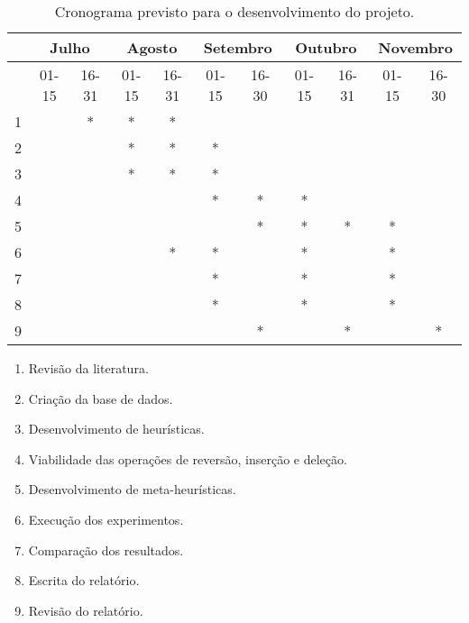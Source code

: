 \documentclass[a4paper, 11pt]{article}
\begin{document}
        \begin{table}[H]
            \centering
            \begin{tabular}{|c||c|c|c|c|c|c|c|c|c|c|}
                \hline
                 & \multicolumn{2}{c|}{Julho} & \multicolumn{2}{c|}{Agosto} & \multicolumn{2}{c|}{Setembro} & \multicolumn{2}{c|}{Outubro} & \multicolumn{2}{c|}{Novembro} \\
                \hline
                 & 01-15 & 16-31 & 01-15 & 16-31 & 01-15 & 16-30 & 01-15 & 16-31 & 01-15 & 16-30 \\
                \hline\hline
                1 & &*&*&*& & & & & & \\
                \hline
                2 & & &*&*&*& & & & & \\
                \hline
                3 & & &*&*&*& & & & & \\
                \hline
                4 & & & & &*&*&*& & & \\
                \hline
                5 & & & & & &*&*&*&*& \\
                \hline
                6 & & & &*&*& &*& &*& \\
                \hline
                7 & & & & &*& &*& &*& \\
                \hline
                8 & & & & &*& &*& &*& \\
                \hline
                9 & & & & & &*& &*& &*\\
                \hline
            \end{tabular}
            \caption{Cronograma previsto para o desenvolvimento do projeto.}
            \label{tab:cronograma}
        \end{table}

        \begin{enumerate}[itemsep=0pt]
            \item Revisão da literatura.
            \item Criação da base de dados.
            \item Desenvolvimento de heurísticas.
            \item Viabilidade das operações de reversão, inserção e deleção.
            \item Desenvolvimento de meta-heurísticas.
            \item Execução dos experimentos.
            \item Comparação dos resultados.
            \item Escrita do relatório.
            \item Revisão do relatório.
        \end{enumerate}
\end{document}
